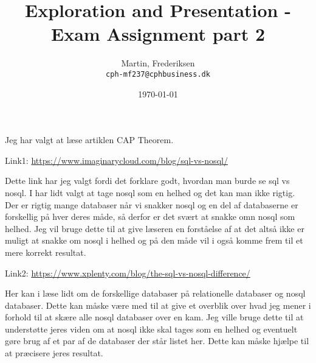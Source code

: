 \documentclass[12pt]{article}
\title{Exploration and Presentation - Exam Assignment part 2}
\author{
    Martin, Frederiksen\\
    \texttt{cph-mf237@cphbusiness.dk}
  }
\date{\today}
\begin{document}
\hypersetup{pageanchor=false}
\maketitle

\noindent Jeg har valgt at læse artiklen CAP Theorem.

\noindent Link1: \url{https://www.imaginarycloud.com/blog/sql-vs-nosql/}

\noindent Dette link har jeg valgt fordi det forklare godt, hvordan man burde se sql vs nosql. I har lidt valgt at tage nosql som en helhed og det kan man ikke rigtig. Der er rigtig mange databaser når vi snakker nosql og en del af databaserne er forskellig på hver deres måde, så derfor er det svært at snakke omn nosql som helhed.
\noindent Jeg vil bruge dette til at give læseren en forståelse af at det altså ikke er muligt at snakke om nosql i helhed og på den måde vil i også komme frem til et mere korrekt resultat.

\newline

\noindent Link2: \url{https://www.xplenty.com/blog/the-sql-vs-nosql-difference/}

\noindent Her kan i læse lidt om de forskellige databaser på relationelle databaser og nosql databaser. Dette kan måske være med til at give et overblik over hvad jeg mener i forhold til at skære alle nosql databaser over en kam.
\noindent Jeg ville bruge dette til at understøtte jeres viden om at nosql ikke skal tages som en helhed og eventuelt gøre brug af et par af de databaser der står listet her. Dette kan måske hjælpe til at præcisere jeres resultat.
\end{document}
